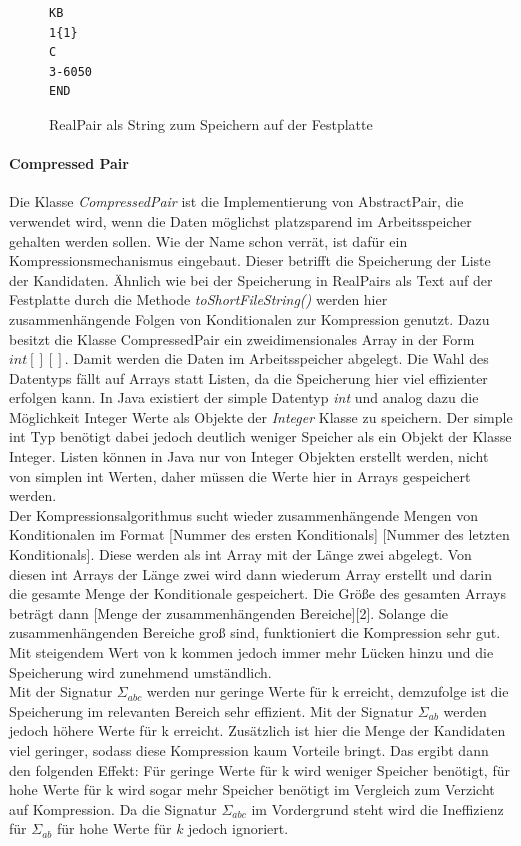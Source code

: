 \documentclass[12pt,a4paper]{article}
\begin{document}
\begin{figure}
\begin{lstlisting}
KB
1{1}
C
3-6050
END
\end{lstlisting}
\caption{RealPair als String zum Speichern auf der Festplatte}
\label{code:pair-text}
\end{figure} 




\paragraph{Compressed Pair}\mbox{}

Die Klasse \textit{CompressedPair} ist die Implementierung von AbstractPair, die verwendet wird, wenn die Daten möglichst platzsparend im Arbeitsspeicher gehalten werden sollen. Wie der Name schon verrät, ist dafür ein Kompressionsmechanismus eingebaut. Dieser betrifft die Speicherung der Liste der Kandidaten. Ähnlich wie bei der Speicherung in RealPairs als Text auf der Festplatte durch die Methode \textit{toShortFileString()} werden hier zusammenhängende Folgen von Konditionalen zur Kompression genutzt. Dazu besitzt die Klasse CompressedPair ein zweidimensionales Array in der Form $int[][]$. Damit werden die Daten im Arbeitsspeicher abgelegt. Die Wahl des Datentyps fällt auf Arrays statt Listen, da die Speicherung hier viel effizienter erfolgen kann. In Java existiert der simple Datentyp \textit{int} und analog dazu die Möglichkeit Integer Werte als Objekte der \textit{Integer} Klasse zu speichern. Der simple int Typ benötigt dabei jedoch deutlich weniger Speicher als ein Objekt der Klasse Integer. Listen können in Java nur von Integer Objekten erstellt werden, nicht von simplen int Werten, daher müssen die Werte hier in Arrays gespeichert werden.\\
Der Kompressionsalgorithmus sucht wieder zusammenhängende Mengen von Konditionalen im Format [Nummer des ersten Konditionals] [Nummer des letzten Konditionals]. Diese werden als int Array mit der Länge zwei abgelegt. Von diesen int Arrays der Länge zwei wird dann wiederum Array erstellt und darin die gesamte Menge der Konditionale gespeichert. Die Größe des gesamten Arrays beträgt dann [Menge der zusammenhängenden Bereiche][2]. Solange die zusammenhängenden Bereiche groß sind, funktioniert die Kompression sehr gut. Mit steigendem Wert von k kommen jedoch immer mehr Lücken hinzu und die Speicherung wird zunehmend umständlich. \\
Mit der Signatur $\Sigma_{abc}$ werden nur geringe Werte für k erreicht, demzufolge ist die Speicherung im relevanten Bereich sehr effizient. Mit der Signatur $\Sigma_{ab}$ werden jedoch höhere Werte für k erreicht. Zusätzlich ist hier die Menge der Kandidaten viel geringer, sodass diese Kompression kaum Vorteile bringt. Das ergibt dann den folgenden Effekt: Für geringe Werte für k wird weniger Speicher benötigt, für hohe Werte für k wird sogar mehr Speicher benötigt im Vergleich zum Verzicht auf Kompression. Da die Signatur $\Sigma_{abc}$ im Vordergrund steht wird die Ineffizienz für $\Sigma_{ab}$ für hohe Werte für $k$  jedoch ignoriert.\\
\end{document}
